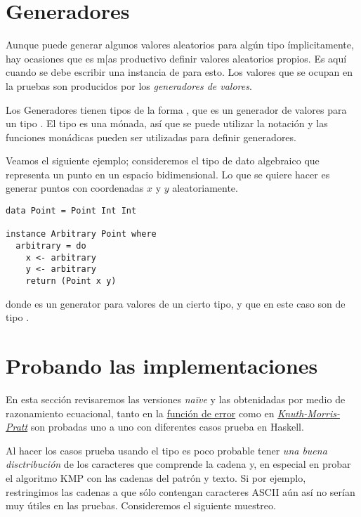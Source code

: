 \section{Generadores}

Aunque {\QuickCheck} puede generar algunos valores aleatorios para algún tipo 
ímplicitamente, hay ocasiones que es m[as productivo definir valores aleatorios  
propios. 
Es aquí cuando se debe escribir una instancia de  
para esto. Los valores que se ocupan en la pruebas son producidos por los 
\textit{generadores de valores}.

Los Generadores tienen tipos de la forma , que es un generador de 
valores para un tipo . El tipo  es una mónada, así que se 
puede utilizar la notación  y las funciones monádicas pueden ser 
utilizadas para definir generadores.

Veamos el siguiente ejemplo; consideremos el tipo de dato algebraico 
 que representa un punto en un espacio bidimensional. Lo que se 
quiere hacer es generar puntos con coordenadas $x$ y $y$ aleatoriamente.

\begin{verbatim}
data Point = Point Int Int

instance Arbitrary Point where
  arbitrary = do
    x <- arbitrary
    y <- arbitrary
    return (Point x y)
\end{verbatim}
donde  es un generator para valores de un cierto 
tipo, y que en este caso son de tipo .


\section{Probando las implementaciones}

En esta sección revisaremos las versiones \emph{naïve} y las 
obtenidadas por medio de razonamiento ecuacional, tanto en la 
\hyperlink{funcional:funcion_error}{función de error} como en 
\hyperlink{funcional:kmp}{\textit{Knuth-Morris-Pratt}} son probadas uno a uno 
con diferentes casos prueba en Haskell.

Al hacer los casos prueba usando el tipo  es poco probable 
tener \textit{una buena disctribución} de los caracteres que comprende la 
cadena y, en especial en probar el algoritmo KMP con las cadenas del patrón y 
texto. Si por ejemplo, restringimos las cadenas a que sólo contengan 
caracteres ASCII aún así no serían muy útiles en las pruebas. Consideremos
el siguiente muestreo.

